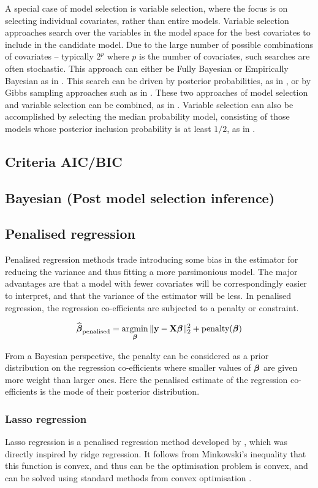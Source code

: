 \documentclass{amsart}[12pt]
\begin{document}
A special case of model selection is variable selection, where the focus is on selecting individual
covariates, rather than entire models. Variable selection approaches search over the
variables in the model space for the best covariates to include in the candidate model. Due to the large
number of possible combinations of covariates -- typically $2^p$ where $p$ is the number of covariates, such
searches are often stochastic. This approach can either be Fully Bayesian or Empirically Bayesian as in
\citep{Cui2008}.  This search can be driven by posterior probabilities, as in \citep{Casella2006}, or by Gibbs
sampling approaches such as in \citep{George1993}. These two approaches of model selection and variable
selection can be combined, as in \citep{Geweke1996}. Variable selection can also be accomplished by selecting
the median probability model, consisting of those models whose posterior inclusion probability is at least
$1/2$, as in \citep{Barbieri2004}.

\subsection{Criteria AIC/BIC}
\subsection{Bayesian (Post model selection inference)}

\subsection{Penalised regression}
Penalised regression methods trade introducing some bias in the estimator for reducing the variance and thus
fitting a more parsimonious model. The major advantages are that a model with fewer covariates will be
correspondingly easier to interpret, and that the variance of the estimator will be less. In penalised
regression, the regression co-efficients are subjected to a penalty or constraint.

$$
\widehat{\vbeta}_{\text{penalised}} = \argmin_\vbeta \|\vy - \mX \vbeta\|_2^2 + \text{penalty}(\vbeta)
$$

From a Bayesian perspective, the penalty can be considered as a prior distribution on the regression 
co-efficients where smaller values of ${\boldsymbol \beta}$ are given more weight than larger ones. Here the penalised
estimate of the regression co-efficients is the mode of their posterior distribution.

\subsubsection{Lasso regression}
Lasso regression is a penalised regression method developed by \citep{Tibshirani1996}, which was directly
inspired by ridge regression.
It follows from Minkowski's inequality that this function is convex, and thus can be the optimisation problem
is convex, and can be solved using standard methods from convex optimisation \citep{Boyd2010}.
\end{document}
